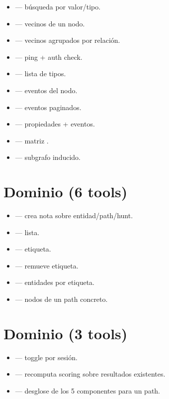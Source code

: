 \begin{itemize}
    \item {} — búsqueda por valor/tipo.
    \item {} — vecinos de un nodo.
    \item {} — vecinos agrupados por
    relación.
    \item {} — ping + auth check.
    \item {} — lista de tipos.
    \item {} — eventos del nodo.
    \item {} — eventos paginados.
    \item {} — propiedades + eventos.
    \item {} — matriz
    .
    \item {} — subgrafo inducido.
\end{itemize}

\section{Dominio  (6 tools)}

\begin{itemize}
    \item {} — crea nota sobre entidad/path/hunt.
    \item {} — lista.
    \item {} — etiqueta.
    \item {} — remueve etiqueta.
    \item {} — entidades por etiqueta.
    \item {} — nodos de un path concreto.
\end{itemize}

\section{Dominio  (3 tools)}

\begin{itemize}
    \item {} — toggle por sesión.
    \item {} — recomputa scoring sobre
    resultados existentes.
    \item {} — desglose de los 5 componentes para
    un path.
\end{itemize}

